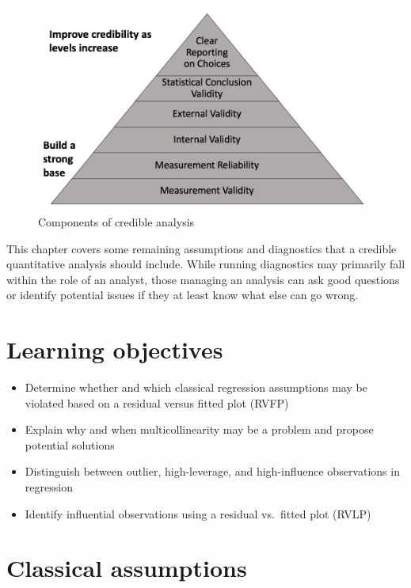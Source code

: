 \documentclass[
]{book}
\providecommand{\tightlist}{%
  \setlength{\itemsep}{0pt}\setlength{\parskip}{0pt}}
\begin{document}
\begin{figure}

{\centering \includegraphics[width=\textwidth]{images/credible} 

}

\caption{Components of credible analysis}\label{fig:credfigrepeat2}
\end{figure}

This chapter covers some remaining assumptions and diagnostics that a credible quantitative analysis should include. While running diagnostics may primarily fall within the role of an analyst, those managing an analysis can ask good questions or identify potential issues if they at least know what else can go wrong.

\hypertarget{lo13}{%
\section{Learning objectives}\label{lo13}}

\begin{itemize}
\tightlist
\item
  Determine whether and which classical regression assumptions may be violated based on a residual versus fitted plot (RVFP)
\item
  Explain why and when multicollinearity may be a problem and propose potential solutions
\item
  Distinguish between outlier, high-leverage, and high-influence observations in regression
\item
  Identify influential observations using a residual vs.~fitted plot (RVLP)
\end{itemize}

\hypertarget{classical-assumptions}{%
\section{Classical assumptions}\label{classical-assumptions}}
\end{document}
